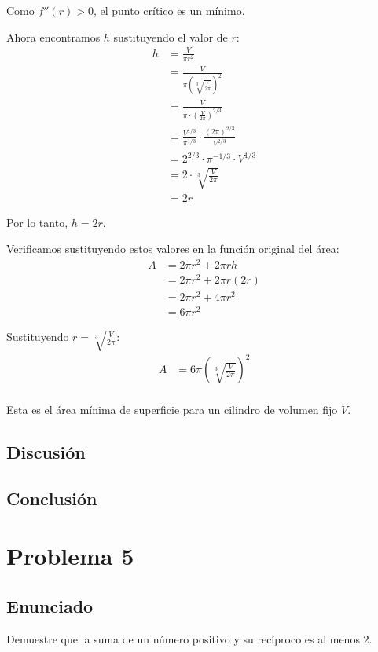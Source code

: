 \documentclass{article}
\begin{document}
Como $f''(r) > 0$, el punto crítico es un mínimo.

Ahora encontramos $h$ sustituyendo el valor de $r$:
\begin{align}
h &= \frac{V}{\pi r^2} \\
&= \frac{V}{\pi \left(\sqrt[3]{\frac{V}{2\pi}}\right)^2} \\
&= \frac{V}{\pi \cdot \left(\frac{V}{2\pi}\right)^{2/3}} \\
&= \frac{V^{1/3}}{\pi^{1/3}} \cdot \frac{(2\pi)^{2/3}}{V^{2/3}} \\
&= 2^{2/3} \cdot \pi^{-1/3} \cdot V^{1/3} \\
&= 2 \cdot \sqrt[3]{\frac{V}{2\pi}} \\
&= 2r
\end{align}

Por lo tanto, $h = 2r$.

Verificamos sustituyendo estos valores en la función original del área:
\begin{align}
A &= 2\pi r^2 + 2\pi rh \\
&= 2\pi r^2 + 2\pi r(2r) \\
&= 2\pi r^2 + 4\pi r^2 \\
&= 6\pi r^2
\end{align}

Sustituyendo $r = \sqrt[3]{\frac{V}{2\pi}}$:
\begin{align}
A &= 6\pi \left(\sqrt[3]{\frac{V}{2\pi}}\right)^2 \\
\end{align}

Esta es el área mínima de superficie para un cilindro de volumen fijo $V$.

\subsection{Discusión}

\subsection{Conclusión}

\section{Problema 5}

\subsection{Enunciado}
Demuestre que la suma de un número positivo y su recíproco es al menos $2$.
\end{document}

